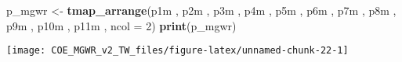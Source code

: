 \documentclass[
  12pt,
]{article}
\newenvironment{Shaded}{\begin{snugshade}}{\end{snugshade}}
\newcommand{\AttributeTok}[1]{\textcolor[rgb]{0.13,0.29,0.53}{#1}}
\newcommand{\DecValTok}[1]{\textcolor[rgb]{0.00,0.00,0.81}{#1}}
\newcommand{\FunctionTok}[1]{\textcolor[rgb]{0.13,0.29,0.53}{\textbf{#1}}}
\newcommand{\NormalTok}[1]{#1}
\newcommand{\OtherTok}[1]{\textcolor[rgb]{0.56,0.35,0.01}{#1}}
\begin{document}
\begin{Shaded}
\begin{Highlighting}[]
\NormalTok{p\_mgwr }\OtherTok{\textless{}{-}} \FunctionTok{tmap\_arrange}\NormalTok{(p1m}
\NormalTok{                     , p2m}
\NormalTok{                     , p3m}
\NormalTok{                     , p4m}
\NormalTok{                     , p5m}
\NormalTok{                     , p6m}
\NormalTok{                     , p7m}
\NormalTok{                     , p8m}
\NormalTok{                     , p9m}
\NormalTok{                     , p10m}
\NormalTok{                     , p11m}
\NormalTok{                     , }\AttributeTok{ncol =} \DecValTok{2}\NormalTok{)}
\FunctionTok{print}\NormalTok{(p\_mgwr)}
\end{Highlighting}
\end{Shaded}

\begin{center}\texttt{[image: COE\_MGWR\_v2\_TW\_files/figure-latex/unnamed-chunk-22-1]} \end{center}
\end{document}
